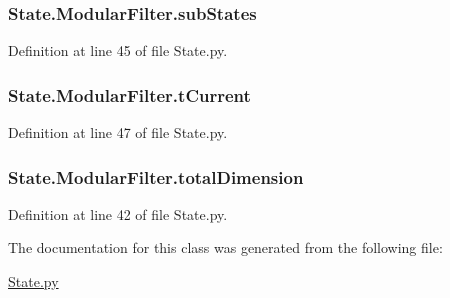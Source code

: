 \subsubsection[{\texorpdfstring{sub\+States}{subStates}}]{\setlength{\rightskip}{0pt plus 5cm}State.\+Modular\+Filter.\+sub\+States}\hypertarget{classState_1_1ModularFilter_af6128daa99126397f282ec0fcdcd3e56}{}\label{classState_1_1ModularFilter_af6128daa99126397f282ec0fcdcd3e56}


Definition at line 45 of file State.\+py.

\subsubsection[{\texorpdfstring{t\+Current}{tCurrent}}]{\setlength{\rightskip}{0pt plus 5cm}State.\+Modular\+Filter.\+t\+Current}\hypertarget{classState_1_1ModularFilter_a2b816cacd5988012193b17fcc0032d9d}{}\label{classState_1_1ModularFilter_a2b816cacd5988012193b17fcc0032d9d}


Definition at line 47 of file State.\+py.

\subsubsection[{\texorpdfstring{total\+Dimension}{totalDimension}}]{\setlength{\rightskip}{0pt plus 5cm}State.\+Modular\+Filter.\+total\+Dimension}\hypertarget{classState_1_1ModularFilter_a40c2ac71e5d1d363f0410ce94b9e8345}{}\label{classState_1_1ModularFilter_a40c2ac71e5d1d363f0410ce94b9e8345}


Definition at line 42 of file State.\+py.



The documentation for this class was generated from the following file\+:\begin{DoxyCompactItemize}
\item 
\hyperlink{State_8py}{State.\+py}\end{DoxyCompactItemize}

